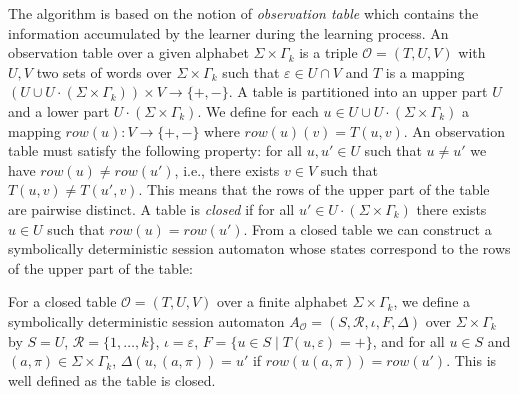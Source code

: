 \documentclass{LMCS}
\newcommand{\Reg}{\mathcal{R}}
\newcommand{\fStates}{F}
\newcommand{\States}{S}
\newcommand{\init}{\iota}
\newcommand{\Trans}{\Delta}
\newcommand{\param}{\pi}
\begin{document}
The algorithm is based on the notion of \emph{observation table} which
contains the information accumulated by the learner during the
learning process.  An observation table over a given alphabet $\Sigma
\times \Gamma_{k}$ is a triple $\mathcal O = (T,U,V)$ with $U,V$ two
sets of words over $\Sigma \times \Gamma_{k}$ such that $\varepsilon
\in U \cap V$ and $T$ is a mapping $(U \mathrel{\cup} U\cdot (\Sigma
\times \Gamma_{k})) \times V \rightarrow \{+,-\}$.  A table is
partitioned into an upper part $U$ and a lower part $U\cdot (\Sigma
\times \Gamma_{k})$.  We define for each $u \in U \mathrel{\cup}
U\cdot (\Sigma \times \Gamma_{k})$ a mapping $row(u)\colon V
\rightarrow \{+,-\}$ where $row(u)(v) = T(u,v)$.  An observation table
must satisfy the following property: for all $u,u' \in U$ such that $u
\not= u'$ we have $row(u) \not= row(u')$, i.e., there exists $v \in V$
such that $T(u,v) \not= T(u',v)$. This means that the rows of the
upper part of the table are pairwise distinct.  A table is
\emph{closed} if for all $u'\in U\cdot (\Sigma \times \Gamma_{k})$
there exists $u \in U$ such that $row(u) = row(u')$.  From a closed
table we can construct a symbolically deterministic session automaton
whose states correspond to the rows of the upper part of the table:

\begin{defi}
  \label{def:autfromtable}
  For a closed table $\mathcal O=(T,U,V)$ over a finite alphabet
  $\Sigma \times \Gamma_{k}$, we define a symbolically deterministic
  session automaton $A_{\mathcal O} =
  (\States,\Reg,\init,\fStates,\Trans)$ over $\Sigma \times
  \Gamma_{k}$ by $\States=U$, $\Reg = \{1,\ldots,k\}$, $\init=
  \varepsilon$, $\fStates=\{u \in \States \mid T(u,\varepsilon)=+\}$,
  and for all $u \in \States$ and $(a,\param) \in \Sigma \times
  \Gamma_{k}$, $\Trans(u,(a,\param)) = u'$ if $row(u(a,\param))=
  row(u')$. This is well defined as the table is closed.
\end{defi}
\end{document}
